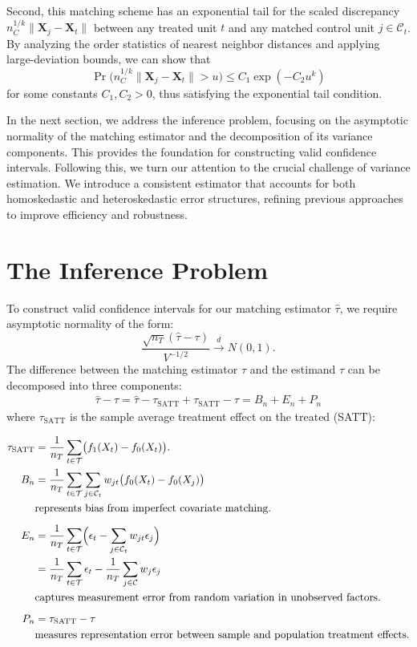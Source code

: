 \documentclass{mytemplate}
\begin{document}
Second, this matching scheme has an exponential tail for the scaled discrepancy $n_C^{1/k}\|\mathbf{X}_j - \mathbf{X}_t\|$ between any treated unit $t$ and any matched control unit $j \in \mathcal{C}_t$. By analyzing the order statistics of nearest neighbor distances and applying large-deviation bounds, we can show that
\[
\Pr\bigl(n_C^{1/k}\|\mathbf{X}_j - \mathbf{X}_t\| > u\bigr) \le C_1 \exp(-C_2 u^k)
\]
for some constants $C_1, C_2>0$, thus satisfying the exponential tail condition.


In the next section, we address the inference problem, focusing on the asymptotic normality of the matching estimator and the decomposition of its variance components. This provides the foundation for constructing valid confidence intervals. Following this, we turn our attention to the crucial challenge of variance estimation. We introduce a consistent estimator that accounts for both homoskedastic and heteroskedastic error structures, refining previous approaches to improve efficiency and robustness.




\section{The Inference Problem}
\label{sec:inference-problem}
To construct valid confidence intervals for our matching estimator $\hat{\tau}$, we require asymptotic normality of the form:
\[
\frac{\sqrt{n_T}\left( \hat{\tau} - \tau \right)}{V^{-1/2}}
\xrightarrow{d}
N(0,1).
\]
The difference between the matching estimator $\hat{\tau}$ and the estimand $\tau$ can be decomposed into three components:
\begin{align}
\hat{\tau} - \tau = \hat{\tau} - \tau_{\text{SATT}} + \tau_{\text{SATT}} - \tau = B_n + E_n + P_n  \label{eq:hat-tau-breakdown}
\end{align}
where $\tau_{\text{SATT}}$ is the sample average treatment effect on the treated (SATT):

\begin{align*}
\tau_{\text{SATT}} &= \frac{1}{n_T} \sum_{t \in \mathcal{T}} \bigl(f_1(X_t) - f_0(X_t)\bigr).\\
B_n &= \frac{1}{n_T} \sum_{t \in \mathcal{T}} \sum_{j \in \mathcal{C}_t} 
w_{jt} \bigl( f_0(X_t) - f_0(X_j) \bigr) \\
&\text{represents bias from imperfect covariate matching.} \\[0.5em]
E_n &= \frac{1}{n_T} \sum_{t \in \mathcal{T}} \Bigl(\epsilon_t - \sum_{j \in \mathcal{C}_t} w_{jt} \epsilon_j\Bigr) \\
&= \frac{1}{n_T} \sum_{t \in \mathcal{T}} \epsilon_t - \frac{1}{n_T} \sum_{j \in \mathcal{C}} w_{j} \epsilon_j \\
&\text{captures measurement error from random variation in unobserved factors.} \\[0.5em]
P_n &= \tau_{\text{SATT}} - \tau \\
&\text{measures representation error between sample and population treatment effects.}
\end{align*}
\end{document}
